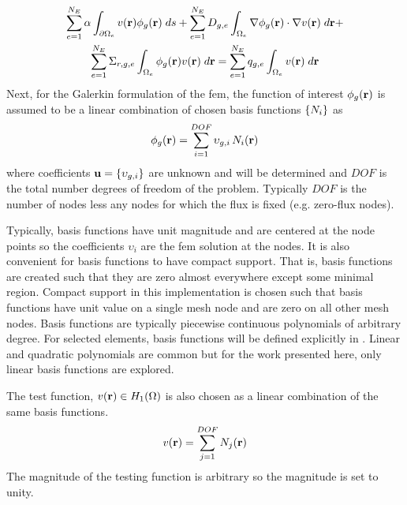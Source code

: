     \begin{multline}
      \label{eq:element_boundary}
      \sum_{e=1}^{N_E} \alpha \int_{\partial \Omega_e} v(\mathbf{r}) 
        \phi_g(\mathbf{r}) \;ds + \sum_{e=1}^{N_E} D_{g,e}
        \int_{\Omega_e} \mathbf{\nabla} \phi_g(\mathbf{r}) \cdot \mathbf{\nabla} v(\mathbf{r}) \; d\mathbf{r} + \\
        \sum_{e=1}^{N_E} \Sigma_{r,g,e} \int_{\Omega_e} \phi_g(\mathbf{r}) v(\mathbf{r}) 
        \; d\mathbf{r} =
        \sum_{e=1}^{N_E} q_{g,e} \int_{\Omega_e} v(\mathbf{r}) \; d\mathbf{r}
    \end{multline}
    Next, for the Galerkin formulation of the \gls{fem}, the function of
    interest $\phi_g(\mathbf{r})$ is assumed to be a linear combination of chosen basis
    functions $\{N_i\}$ as
    \begin{equation} 
      \label{eq:linear_combination}
      \phi_g(\mathbf{r}) = \sum_{i=1}^{DOF} \upsilon_{g,i} \, N_i(\mathbf{r})
    \end{equation}
    where coefficients $\mathbf{u} = \{\upsilon_{g,i}\}$ are unknown and will be 
    determined and $DOF$ is the total number degrees of freedom of the problem. 
    Typically $DOF$ is the number of nodes less any nodes for which the flux is 
    fixed (e.g. zero-flux nodes). 
    
    Typically, basis functions have unit magnitude and are centered at the node
    points so the coefficients $\upsilon_i$ are the \gls{fem} solution at the
    nodes. It is also convenient for basis functions to have compact support.
    That is, basis functions are created such that they are zero almost
    everywhere except some minimal region. Compact support in this
    implementation is chosen such that basis functions have unit value on a
    single mesh node and are zero on all other mesh nodes. Basis functions are
    typically piecewise continuous polynomials of arbitrary degree. For selected
    elements, basis functions will be defined explicitly in
    . Linear and quadratic polynomials are common
    but for the work presented here, only linear basis functions are explored.

    The test function, $v(\mathbf{r}) \in H_1(\Omega)$ is also chosen as a linear 
    combination of the same basis functions.
    \begin{equation} 
      \label{eq:linear_superposition}
      v(\mathbf{r}) = \sum_{j=1}^{DOF} N_j(\mathbf{r})
    \end{equation}
    The magnitude of the testing function is arbitrary so the magnitude is set
    to unity.
    
